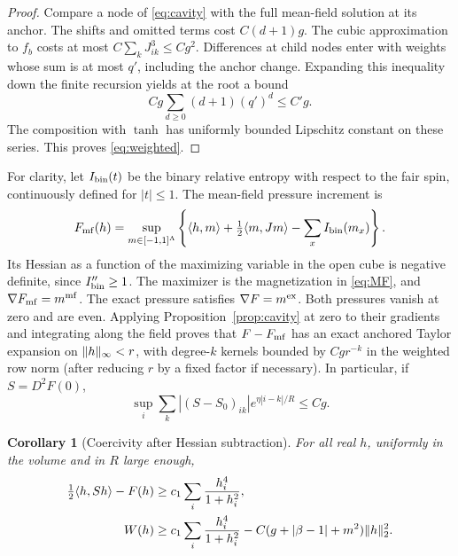 \documentclass[11pt]{article}
\newtheorem{corollary}[proposition]{Corollary}
\DeclarePairedDelimiter{\norm}{\lVert}{\rVert}
\begin{document}
\begin{proof}
Compare a node of \eqref{eq:cavity} with the full mean-field solution
at its anchor. The shifts and omitted terms cost
\(C(d+1)g\). The cubic approximation to \(f_b\) costs at most
\(C\sum_k J_{ik}^3\le Cg^2\). Differences at child nodes enter
with weights whose sum is at most \(q'\), including the anchor change.
Expanding this inequality down the finite recursion yields at the
root a bound
\[
 Cg\sum_{d\ge0}(d+1)(q')^d\le C'g.
\]
The composition with \(\tanh\) has uniformly bounded Lipschitz constant
on these series. This proves \eqref{eq:weighted}.
\end{proof}

For clarity, let \(I_{\rm bin}(t)\) be the binary relative entropy with
respect to the fair spin, continuously defined for \(|t|\le1\).
The mean-field pressure increment is
\[
 F_{\rm mf}(h)=
 \sup_{m\in[-1,1]^\Lambda}
 \left\{\langle h,m\rangle+\tfrac12\langle m,Jm\rangle
                  -\sum_x I_{\rm bin}(m_x)\right\}.
\]
Its Hessian as a function of the maximizing variable in the open
cube is negative definite, since \(I_{\rm bin}''\ge1\).
The maximizer is the magnetization in \eqref{eq:MF}, and
\(\nabla F_{\rm mf}=m^{\rm mf}\). The exact pressure satisfies
\(\nabla F=m^{\rm ex}\). Both pressures vanish at zero and are even.
Applying Proposition~\ref{prop:cavity} at zero to their gradients
and integrating along the field proves that \(F-F_{\rm mf}\) has an
exact anchored Taylor expansion on \(\norm h_\infty<r\), with
degree-\(k\) kernels bounded by \(Cg r^{-k}\) in the weighted
row norm (after reducing \(r\) by a fixed factor if necessary).
In particular, if \(S=D^2F(0)\),
\begin{equation}\label{eq:sus}
 \sup_i\sum_k |(S-S_0)_{ik}|e^{\eta|i-k|/R}
 \le Cg .
\end{equation}

\begin{corollary}[Coercivity after Hessian subtraction]\label{cor:stable}
For all real \(h\), uniformly in the volume and in \(R\) large enough,
\begin{align}
 \tfrac12\langle h,Sh\rangle-F(h)
   &\ge c_1\sum_i\frac{h_i^4}{1+h_i^2},\\
 W(h)&\ge c_1\sum_i\frac{h_i^4}{1+h_i^2}
       - C(g+|\beta-1|+m^2)\norm h_2^2 .
       \label{eq:stabilityW}
\end{align}
\end{corollary}
\end{document}
